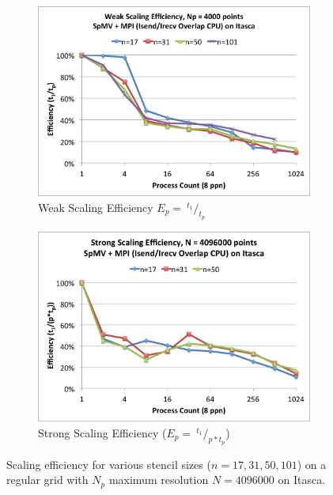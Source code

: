 \documentclass{report}
\begin{document}
\begin{figure}
\centering
\begin{subfigure}{0.48\textwidth}
\centering
\includegraphics[width=\textwidth]{performance_content/scaling/weak_scaling_efficiency_np4000_overlap_cpu_SpMV_and_comm_all_stencils.png}
\caption{Weak Scaling Efficiency $E_p = \ ^{t_1}/_{t_p}$}
\label{fig:compare_weak_scaling_efficiency_all_stencils}
\end{subfigure}
\begin{subfigure}{0.48\textwidth}
\centering
\includegraphics[width=\textwidth]{performance_content/scaling/strong_scaling_efficiency_4M_overlap_cpu_SpMV_and_comm_all_stencils.png}
\caption{Strong Scaling Efficiency ($E_p = \ ^{t_{1}}/_{p*t_p} $)}
\label{fig:compare_strong_scaling_efficiency_all_stencils}
\end{subfigure}
\caption{Scaling efficiency for various stencil sizes ($n=17, 31, 50, 101$) on a regular grid with $N_p$ maximum resolution $N=4096000$ on Itasca. } 
\end{figure}
\end{document}
